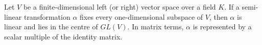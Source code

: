 Let $V$ be a finite-dimensional left (or right) vector space over a field $K$. If a semi-linear transformation $\alpha$ fixes every one-dimensional subspace of $V$, then $\alpha$ is linear and lies in the centre of $GL(V)$. In matrix terms, $\alpha$ is represented by a scalar multiple of the identity matrix.
